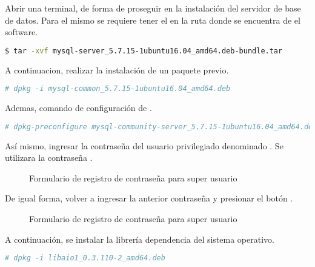 Abrir una terminal, de forma de proseguir en la instalación del servidor de
base de datos. Para el mismo se requiere tener el  en
la ruta donde se encuentra de el software.

\begin{lstlisting}[language=bash, caption={Comando para descomprimir archivos}]
$ tar -xvf mysql-server_5.7.15-1ubuntu16.04_amd64.deb-bundle.tar 
\end{lstlisting}

A continuacion, realizar la instalación de un paquete previo.

\begin{lstlisting}[language=bash, caption={Instalación de dependencia servidor de base de datos}]
# dpkg -i mysql-common_5.7.15-1ubuntu16.04_amd64.deb 
\end{lstlisting}

Ademas, comando de configuración de .

\begin{lstlisting}[language=bash, caption={Comando para configurar servidor de base de datos}]
# dpkg-preconfigure mysql-community-server_5.7.15-1ubuntu16.04_amd64.deb
\end{lstlisting}

Así mismo, ingresar la contraseña del usuario privilegiado denominado 
. Se utilizara la contraseña 
.

\begin{figure}[!ht]
\centering
		\caption{Formulario de registro de contraseña para super usuario}
\end{figure}

De igual forma, volver a ingresar la anterior contraseña y presionar el botón 
.

\begin{figure}[!ht]
\centering
		\caption{Formulario de registro de contraseña para super usuario}
\end{figure}

A continuación, se instalar la librería dependencia del sistema operativo.

\begin{lstlisting}[language=bash, caption={Comando para instalar librería}]
# dpkg -i libaio1_0.3.110-2_amd64.deb 
\end{lstlisting}

